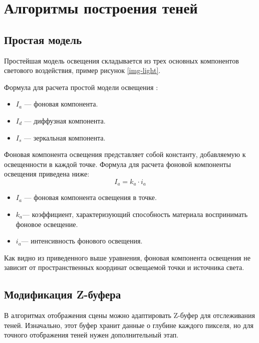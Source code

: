 \section{Алгоритмы построения теней}

\subsection{Простая модель}

Простейшая модель освещения складывается из трех основных компонентов светового воздействия, пример рисунок \ref{img-light}.
 \cite{lightmodf}

Формула для расчета простой модели освещения \cite{lightmodf}:
\begin{itemize}
	\item $I_{a}$ --- фоновая компонента.
	\item $I_{d}$ --- диффузная компонента.
	\item $I_{s}$ --- зеркальная компонента.
\end{itemize}

Фоновая компонента освещения представляет собой константу, добавляемую к освещенности в каждой точке. Формула для расчета фоновой компоненты освещения приведена ниже: \begin{equation}
	I_{a}=k_{a} \cdot i_{a}
\end{equation}
\begin{itemize}
	\item $I_{a}$ --- фоновая компонента освещения в точке.
	\item $k_{a}$​ --- коэффициент, характеризующий способность материала воспринимать фоновое освещение.
	\item $i_{a}$​ --- интенсивность фонового освещения.
\end{itemize}

Как видно из приведенного выше уравнения, фоновая компонента освещения не зависит от пространственных координат освещаемой точки и источника света.




\subsection{Модификация  Z-буфера}
В алгоритмах отображения сцены можно адаптировать Z-буфер для отслеживания теней. Изначально, этот буфер хранит данные о глубине каждого пикселя, но для точного отображения теней нужен дополнительный этап.




